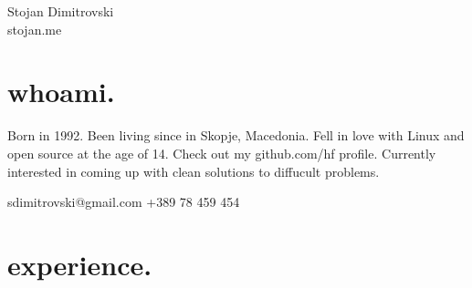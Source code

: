 \documentclass[a4paper,notitlepage]{report}
\begin{document}
\vspace{-2em}

\begingroup
  \centering
  \LARGE Stojan Dimitrovski \\
  \small stojan.me \\
\endgroup


\section*{whoami.}

Born in 1992. Been living since in Skopje, Macedonia. Fell in love with Linux
and open source at the age of 14. Check out my github.com/hf profile. Currently
interested in coming up with clean solutions to diffucult problems.

\begin{center}
  sdimitrovski@gmail.com \quad +389 78 459 454
\end{center}

\section*{experience.}
\end{document}
